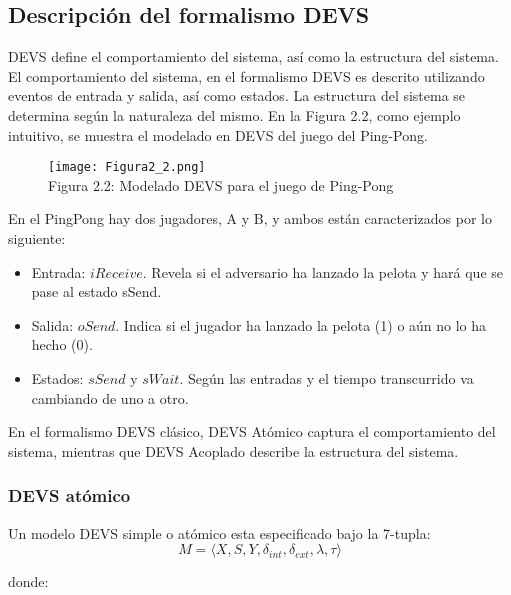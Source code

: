 \subsection{Descripción del formalismo DEVS}
DEVS define el comportamiento del sistema, así como la estructura del sistema. El comportamiento del sistema, en el formalismo DEVS es descrito utilizando eventos de entrada y salida, así como estados. La estructura del sistema se determina según la naturaleza del mismo.
En la Figura 2.2, como ejemplo intuitivo, se muestra el modelado en DEVS del juego del Ping-Pong.

\begin{figure}[!ht]
\begin{center}
\texttt{[image: Figura2\_2.png]}\\[0.5cm]
Figura 2.2: Modelado DEVS para el juego de Ping-Pong
\end{center}
\end{figure}

En el PingPong hay dos jugadores, A y B, y ambos están caracterizados por lo siguiente:
\begin{itemize}
\item Entrada: $iReceive$. Revela si el adversario ha lanzado la pelota y hará que se pase al estado sSend.
\end{itemize}
\begin{itemize}
\item Salida: $oSend$. Indica si el jugador ha lanzado la pelota (1) o aún no lo ha hecho (0).
\end{itemize}
\begin{itemize}
\item Estados: $sSend$ y $sWait$. Según las entradas y el tiempo transcurrido va cambiando de uno a otro.
\end{itemize}

En el formalismo DEVS clásico, DEVS Atómico captura el comportamiento del sistema, mientras que DEVS Acoplado describe la estructura del sistema.

\subsubsection{DEVS atómico}
Un modelo DEVS simple o atómico esta especificado bajo la 7-tupla:
\begin{equation}\label{eq:DevsAtomic}
M = \langle X,S,Y,\delta_{int},\delta_{ext},\lambda,\tau\rangle
\end{equation}

\noindent donde:

